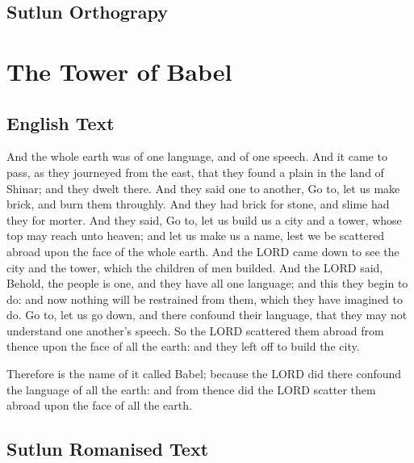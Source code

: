\documentclass{article}
\begin{document}
\subsection{Sutlun Orthograpy}

\newpage
\section{The Tower of Babel}
\subsection{English Text}

    And the whole earth was of one language, and of one speech.
    And it came to pass, as they journeyed from the east, that they found a plain in the land of Shinar;
    and they dwelt there.
    And they said one to another, Go to, let us make brick, and burn them throughly.
    And they had brick for stone, and slime had they for morter.
    And they said, Go to, let us build us a city and a tower, whose top may reach unto heaven;
    and let us make us a name, lest we be scattered abroad upon the face of the whole earth.
    And the LORD came down to see the city and the tower, which the children of men builded.
    And the LORD said, Behold, the people is one, and they have all one language; and this they begin to do:
    and now nothing will be restrained from them, which they have imagined to do.
    Go to, let us go down, and there confound their language, that they may not understand one another's speech.
    So the LORD scattered them abroad from thence upon the face of all the earth: and they left off to build the city.

    Therefore is the name of it called Babel; because the LORD did there confound the language of all the earth:
    and from thence did the LORD scatter them abroad upon the face of all the earth.

\subsection{Sutlun Romanised Text}
\end{document}
